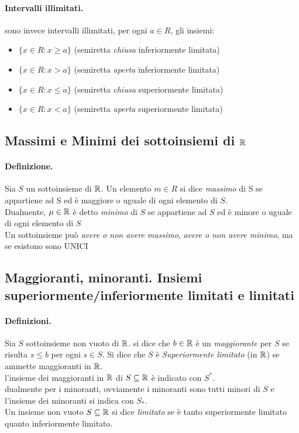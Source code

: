 \documentclass[12pt, a4paper, openany]{book}
\begin{document}
\paragraph{Intervalli illimitati.} sono invece intervalli illimitati, per ogni $a \in R$, gli insiemi:
\begin{itemize}
	\item[] $\{x \in R: x \geq a\}$ (semiretta \emph{chiusa} inferiormente limitata)
	\item[] $\{x \in R: x > a\}$ (semiretta \emph{aperta} inferiormente limitata)
	\item[] $\{x \in R: x \leq a\}$ (semiretta \emph{chiusa} superiormente limitata)
	\item[] $\{x \in R: x < a\}$ (semiretta \emph{aperta} superiormente limitata)
\end{itemize}

\subsection*{Massimi e Minimi dei sottoinsiemi di $\mathbb{R}$}
\paragraph{Definizione.} Sia $S$ un sottoinsieme di $\mathbb{R}$. Un elemento $m\in R$ si dice \emph{massimo} di S se appartiene ad S ed è maggiore o uguale di ogni elemento di $S$.
\\Dualmente, $\mu \in \mathbb{R} $ è detto \emph{minimo} di $S$ se appartiene ad $S$ ed è minore o uguale di ogni elemento di $S$
\\Un sottoinsieme può \emph{avere o non avere massimo}, \emph{avere o non avere minimo}, ma se esistono sono UNICI

\subsection*{Maggioranti, minoranti. Insiemi superiormente/inferiormente limitati e limitati}
\paragraph{Definizioni.} Sia $S$ sottoinsieme non vuoto di $\mathbb{R}$. si dice che $b\in \mathbb{R}$ è un \emph{maggiorante} per $S$ se risulta $s\leq b$ per ogni $s \in S$. Si dice che $S$ è \emph{Superiormente limitato} (in $\mathbb{R}$) se ammette maggioranti in $\mathbb{R}$.
\\l'insieme dei maggioranti in $\mathbb{R}$ di $S\subseteq \mathbb{R}$ è indicato con $S^*$.
\\dualmente per i minoranti, ovviamente i minoranti sono tutti minori di $S$ e l'insieme dei minoranti si indica con $S_*$.
\\Un insieme non vuoto $S \subseteq \mathbb{R}$ si dice \emph{limitato} se è tanto superiormente limitato quanto inferiormente limitato.
\end{document}
